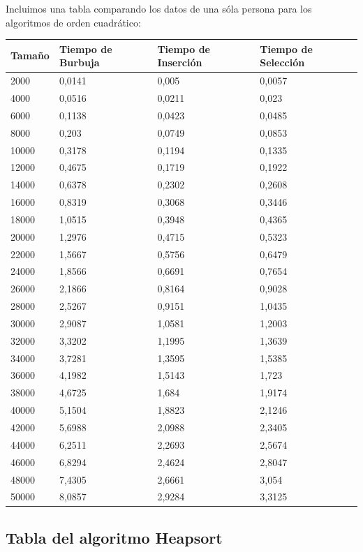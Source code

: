 \documentclass[a4paper, 11pt]{article}
\begin{document}
Incluimos una tabla comparando los datos de una sóla persona para los algoritmos
de orden cuadrático:

\begin{tabular}{|l|l|l|l|}
	\hline
	Tamaño &Tiempo de Burbuja &Tiempo de  Inserción &Tiempo de  Selección \\
	\hline
	\hline
	2000 & 0,0141 & 0,005 & 0,0057 \\
	\hline
	4000 & 0,0516 & 0,0211 & 0,023 \\
	\hline
	6000 & 0,1138 & 0,0423 & 0,0485 \\
	\hline
	8000 & 0,203 & 0,0749 & 0,0853 \\
	\hline
	10000 & 0,3178 & 0,1194 & 0,1335 \\
	\hline
	12000 & 0,4675 & 0,1719 & 0,1922 \\
	\hline
	14000 & 0,6378 & 0,2302 & 0,2608 \\
	\hline
	16000 & 0,8319 & 0,3068 & 0,3446 \\
	\hline
	18000 & 1,0515 & 0,3948 & 0,4365 \\
	\hline
	20000 & 1,2976 & 0,4715 & 0,5323 \\
	\hline
	22000 & 1,5667 & 0,5756 & 0,6479 \\
	\hline
	24000 & 1,8566 & 0,6691 & 0,7654 \\
	\hline
	26000 & 2,1866 & 0,8164 & 0,9028 \\
	\hline
	28000 & 2,5267 & 0,9151 & 1,0435 \\
	\hline
	30000 & 2,9087 & 1,0581 & 1,2003 \\
	\hline
	32000 & 3,3202 & 1,1995 & 1,3639 \\
	\hline
	34000 & 3,7281 & 1,3595 & 1,5385 \\
	\hline
	36000 & 4,1982 & 1,5143 & 1,723 \\
	\hline
	38000 & 4,6725 & 1,684 & 1,9174 \\
	\hline
	40000 & 5,1504 & 1,8823 & 2,1246 \\
	\hline
	42000 & 5,6988 & 2,0988 & 2,3405 \\
	\hline
	44000 & 6,2511 & 2,2693 & 2,5674 \\
	\hline
	46000 & 6,8294 & 2,4624 & 2,8047 \\
	\hline
	48000 & 7,4305 & 2,6661 & 3,054 \\
	\hline
	50000 & 8,0857 & 2,9284 & 3,3125 \\
	\hline
\end{tabular}

\subsection{Tabla del algoritmo Heapsort}

\end{document}
